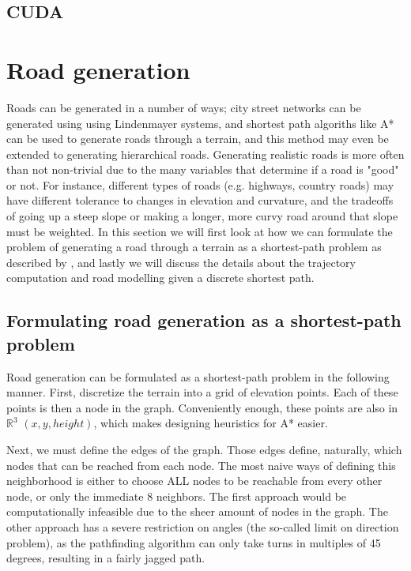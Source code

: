 \subsection{CUDA}

\section{Road generation}
Roads can be generated in a number of ways; city street networks can be generated using using Lindenmayer systems\cite{citymodelling}, and shortest path algoriths like A* can be used to generate roads through a terrain, and this method may even be extended to generating hierarchical roads.\cite{roadgen}\cite{roadgen2}
Generating realistic roads is more often than not non-trivial due to the many variables that determine if a road is "good" or not. For instance, different types of roads (e.g. highways, country roads) may have different tolerance to changes in elevation and curvature, and the tradeoffs of going up a steep slope or making a longer, more curvy road around that slope must be weighted. In this section we will first look at how we can formulate the problem of generating a road through a terrain as a shortest-path problem as described by \cite{roadgen}, and lastly we will discuss the details about the trajectory computation and road modelling given a discrete shortest path.

\subsection{Formulating road generation as a shortest-path problem}
Road generation can be formulated as a shortest-path problem in the following manner. First, discretize the terrain into a grid of elevation points. Each of these points is then a node in the graph. Conveniently enough, these points are also in $\mathbb{R}^3$ $(x,y,height)$, which makes designing heuristics for A* easier.

Next, we must define the edges of the graph. Those edges define, naturally, which nodes that can be reached from each node. The most naive ways of defining this neighborhood is either to choose ALL nodes to be reachable from every other node, or only the immediate 8 neighbors. The first approach would be computationally infeasible due to the sheer amount of nodes in the graph. The other approach has a severe restriction on angles (the so-called limit on direction problem\cite{roadgen}), as the pathfinding algorithm can only take turns in multiples of 45 degrees, resulting in a fairly jagged path. 

